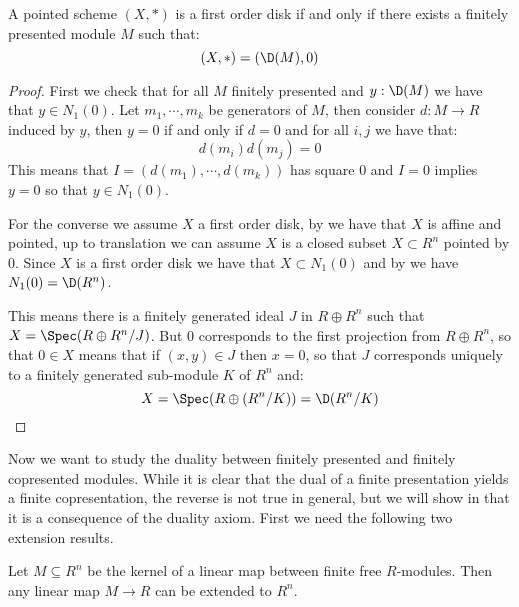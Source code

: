 \begin{lemma}\label{disk-are-infinitesimal}
A pointed scheme $(X,*)$ is a first order disk if and only if there exists a finitely presented module $M$ such that:
\[(X,*) = (\D(M),0)\]
\end{lemma}

\begin{proof}
First we check that for all $M$ finitely presented and $y:\D(M)$ we have that $y\in N_1(0)$. Let $m_1,\cdots, m_k$ be generators of $M$, then consider $d:M\to R$ induced by $y$, then $y=0$ if and only if $d=0$ and for all $i,j$ we have that:
\[d(m_i)d(m_j) = 0\]
This means that $I = (d(m_1),\cdots,d(m_k))$ has square $0$ and $I=0$ implies $y=0$ so that $y\in N_1(0)$.

For the converse we assume $X$ a first order disk, by  we have that $X$ is affine and pointed, up to translation we can assume $X$ is a closed subset $X\subset R^n$ pointed by $0$. Since $X$ is a first order disk we have that $X\subset N_1(0)$ and by  we have $N_1(0) = \D(R^n)$.

This means there is a finitely generated ideal $J$ in $R\oplus R^n$ such that $X=\Spec(R\oplus R^n / J)$.
But $0$ corresponds to the first projection from $R\oplus R^n$, so that $0\in X$ means that if $(x,y)\in J$ then $x=0$, so that $J$ corresponds uniquely to a finitely generated sub-module $K$ of $R^n$ and:
\[X = \Spec(R\oplus (R^n/K)) = \D(R^n/K)\] 
\end{proof}

Now we want to study the duality between finitely presented and finitely copresented modules. While it is clear that the dual of a finite presentation yields a finite copresentation, the reverse is not true in general, but we will show  in  that it is a consequence of the duality axiom. First we need the following two extension results.

\begin{lemma}
  \label{extend-from-kernel}
  Let $M\subseteq R^n$ be the kernel of a linear map between finite free $R$-modules.
  Then any linear map $M\to R$ can be extended to $R^n$.
\end{lemma}

